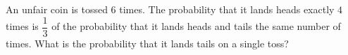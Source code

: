 An unfair coin is tossed $6$ times. The probability that it lands heads exactly $4$ times is $\dfrac{1}{3}$ of the probability that it lands heads and tails the same number of times. What is the probability that it lands tails on a single toss?
